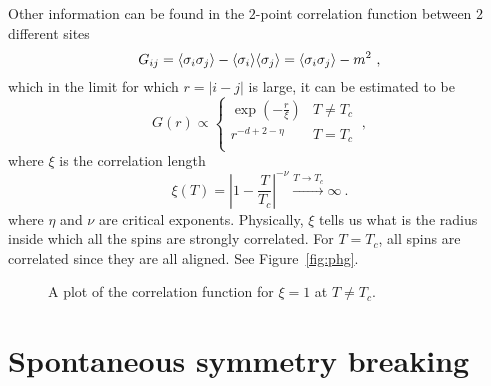     Other information can be found in the $2$-point correlation function between $2$ different sites
    \begin{equation*}
        G_{ij} = \langle\sigma_i \sigma_j\rangle - \langle\sigma_i\rangle \langle\sigma_j\rangle =  \langle\sigma_i \sigma_j\rangle - m^2 ~,
    \end{equation*}
    which in the limit for which $r = |i - j|$ is large, it can be estimated to be 
    \begin{equation}\label{ph:eta}
        G(r) \propto \begin{cases}
            \exp(- \frac{r}{\xi}) & T \neq T_c \\
            r^{-d+2-\eta} & T = T_c \\
        \end{cases} ~,
    \end{equation}
    where $\xi$ is the correlation length 
    \begin{equation}\label{ph:nu}
        \xi(T) = |1 - \frac{T}{T_c}|^{-\nu} \xrightarrow{T \rightarrow T_c} \infty ~.
    \end{equation}
    where $\eta$ and $\nu$ are critical exponents. Physically, $\xi$ tells us what is the radius inside which all the spins are strongly correlated. For $ T = T_c$, all spins are correlated since they are all aligned. See Figure~\eqref{fig:phg}.

    \begin{figure}[h!]
        \centering
        \caption{A plot of the correlation function for $\xi = 1$ at $T \neq T_c$.}
        \label{fig:phg}
    \end{figure}

\section{Spontaneous symmetry breaking}

